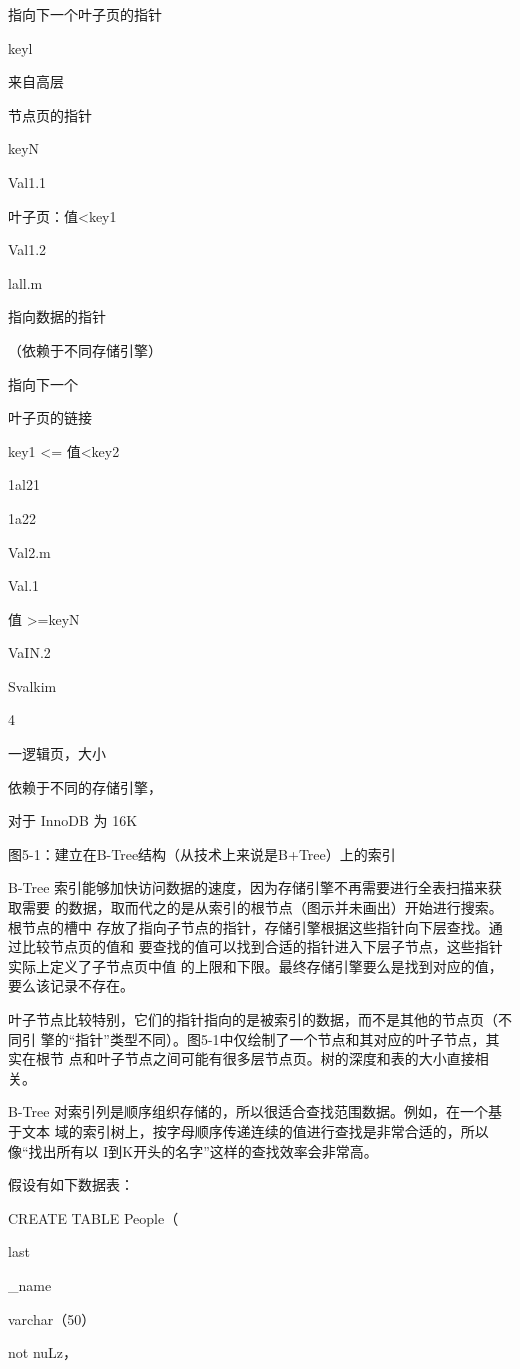指向下一个叶子页的指针

keyl

来自高层

节点页的指针

keyN

Val1.1

叶子页：值<key1

Val1.2

lall.m

指向数据的指针

（依赖于不同存储引擎）

指向下一个

叶子页的链接

key1 <= 值<key2

1al21

1a22

Val2.m

Val.1

值 >=keyN

VaIN.2

Svalkim

4

一逻辑页，大小

依赖于不同的存储引擎，

对于 InnoDB 为 16K

图5-1：建立在B-Tree结构（从技术上来说是B+Tree）上的索引

B-Tree 索引能够加快访问数据的速度，因为存储引擎不再需要进行全表扫描来获取需要
的数据，取而代之的是从索引的根节点（图示并未画出）开始进行搜索。根节点的槽中
存放了指向子节点的指针，存储引擎根据这些指针向下层查找。通过比较节点页的值和
要查找的值可以找到合适的指针进入下层子节点，这些指针实际上定义了子节点页中值
的上限和下限。最终存储引擎要么是找到对应的值，要么该记录不存在。

叶子节点比较特别，它们的指针指向的是被索引的数据，而不是其他的节点页（不同引
擎的“指针”类型不同）。图5-1中仅绘制了一个节点和其对应的叶子节点，其实在根节
点和叶子节点之间可能有很多层节点页。树的深度和表的大小直接相关。

B-Tree 对索引列是顺序组织存储的，所以很适合查找范围数据。例如，在一个基于文本
域的索引树上，按字母顺序传递连续的值进行查找是非常合适的，所以像“找出所有以
I到K开头的名字”这样的查找效率会非常高。

假设有如下数据表：

CREATE TABLE People（

last

\_name

varchar（50）

not nuLz，

